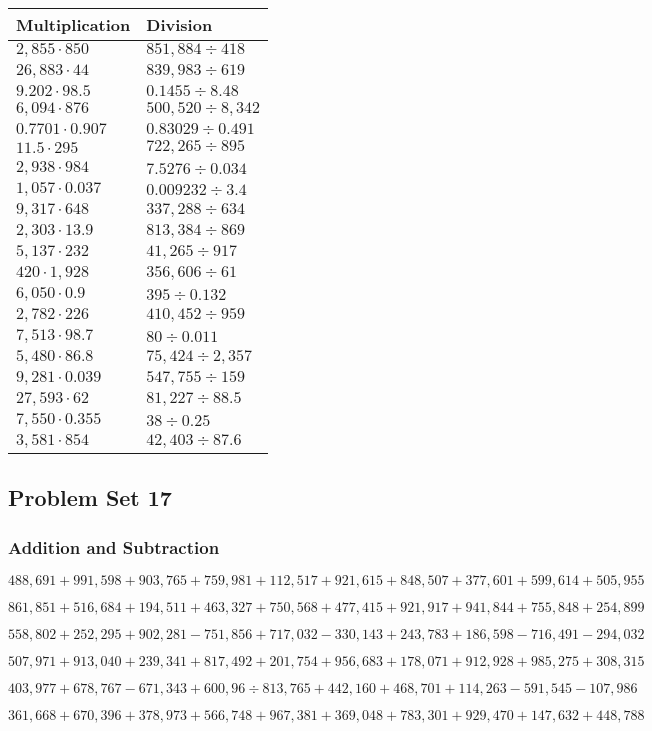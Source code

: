 \begin{longtable}[]{@{}ll@{}}
\toprule
Multiplication & Division\tabularnewline
\midrule
\endhead
\(2,855\cdot850\) & \(851,884÷418\)\tabularnewline
\(26,883\cdot44\) & \(839,983÷619\)\tabularnewline
\(9.202\cdot98.5\) & \(0.1455÷8.48\)\tabularnewline
\(6,094\cdot876\) & \(500,520÷8,342\)\tabularnewline
\(0.7701\cdot0.907\) & \(0.83029÷0.491\)\tabularnewline
\(11.5\cdot295\) & \(722,265÷895\)\tabularnewline
\(2,938\cdot984\) & \(7.5276÷0.034\)\tabularnewline
\(1,057\cdot0.037\) & \(0.009232÷3.4\)\tabularnewline
\(9,317\cdot648\) & \(337,288÷634\)\tabularnewline
\(2,303\cdot13.9\) & \(813,384÷869\)\tabularnewline
\(5,137\cdot232\) & \(41,265÷917\)\tabularnewline
\(420\cdot1,928\) & \(356,606÷61\)\tabularnewline
\(6,050\cdot0.9\) & \(395÷0.132\)\tabularnewline
\(2,782\cdot226\) & \(410,452÷959\)\tabularnewline
\(7,513\cdot98.7\) & \(80÷0.011\)\tabularnewline
\(5,480\cdot86.8\) & \(75,424÷2,357\)\tabularnewline
\(9,281\cdot0.039\) & \(547,755÷159\)\tabularnewline
\(27,593\cdot62\) & \(81,227÷88.5\)\tabularnewline
\(7,550\cdot0.355\) & \(38÷0.25\)\tabularnewline
\(3,581\cdot854\) & \(42,403÷87.6\)\tabularnewline
\bottomrule
\end{longtable}

\hypertarget{problem-set-17-5}{%
\subsection{Problem Set 17}\label{problem-set-17-5}}

\hypertarget{addition-and-subtraction-322}{%
\subsubsection{Addition and
Subtraction}\label{addition-and-subtraction-322}}

\(488,691+991,598+903,765+759,981+112,517+921,615+848,507+377,601+599,614+ 505,955\)

\(861,851+516,684+194,511+463,327+750,568+477,415+921,917+941,844+755,848+254,899\)

\(558,802+252,295+902,281-751,856+717,032-330,143+243,783+186,598-716,491-294,032\)

\(507,971+913,040+239,341+817,492+201,754+956,683+178,071+912,928+985,275+308,315\)

\(403,977+678,767-671,343+600,96÷813,765+442,160+468,701+114,263-591,545-107,986\)

\(361,668+670,396+378,973+566,748+967,381+369,048+783,301+929,470+147,632+448,788\)


